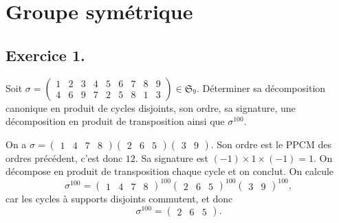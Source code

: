 \documentclass[./main]{subfiles}
\begin{document}
  \chapter{Groupe symétrique}
  \minitoc

  \section{Exercice 1.}
  \begin{enonce}
    Soit $\sigma = \begin{pmatrix} 1 & 2 & 3 & 4 & 5 & 6 & 7 & 8 & 9\\ 4 & 6 & 9 & 7 & 2 & 5 & 8 & 1 & 3 \end{pmatrix} \in \mathfrak{S}_9$.
    Déterminer sa décomposition canonique en produit de cycles disjoints, son ordre, sa signature, une décomposition en produit de transposition ainsi que $\sigma^{100}$.
  \end{enonce}

  On a $\sigma = \begin{pmatrix} 1 & 4 & 7 & 8 \end{pmatrix} \begin{pmatrix} 2 & 6 & 5 \end{pmatrix}\begin{pmatrix} 3 & 9 \end{pmatrix}$.
  Son ordre est le PPCM des ordres précédent, c'est donc $12$.
  Sa signature est $(-1) \times 1 \times (-1) = 1$.
  On décompose en produit de transposition chaque cycle et on conclut.
  On calcule \[
  \sigma^{100} = \begin{pmatrix} 1 & 4 & 7 & 8 \end{pmatrix}^{100} \begin{pmatrix} 2 & 6 & 5 \end{pmatrix}^{100}\begin{pmatrix} 3 & 9 \end{pmatrix}^{100}
  ,\] car les cycles à supports disjoints commutent, et donc \[
  \sigma^{100} = \begin{pmatrix} 2 & 6 & 5 \end{pmatrix} 
  .\] 
\end{document}
